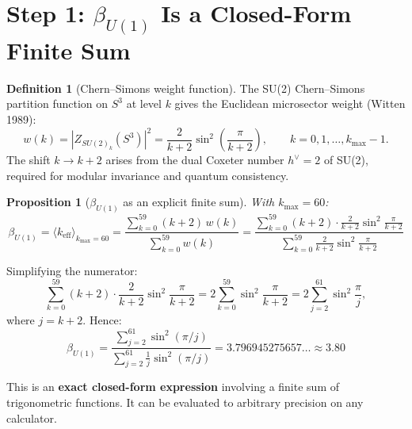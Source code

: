 \documentclass[11pt,a4paper]{article}
\newtheorem{proposition}{Proposition}
\theoremstyle{definition}
\newtheorem{definition}{Definition}
\begin{document}
\section{Step 1: $\beta_{U(1)}$ Is a Closed-Form Finite Sum}

\begin{definition}[Chern--Simons weight function]
The SU(2) Chern--Simons partition function on $S^3$ at level $k$ gives the
Euclidean microsector weight (Witten 1989):
\begin{equation}\label{eq:CS-weight}
w(k) = |Z_{SU(2)_k}(S^3)|^2 = \frac{2}{k+2}\sin^2\!\left(\frac{\pi}{k+2}\right),
\qquad k = 0, 1, \ldots, k_{\max}-1.
\end{equation}
The shift $k \to k+2$ arises from the dual Coxeter number $h^\vee = 2$ of SU(2),
required for modular invariance and quantum consistency.
\end{definition}

\begin{proposition}[$\beta_{U(1)}$ as an explicit finite sum]
\label{prop:beta}
With $k_{\max} = 60$:
\begin{equation}\label{eq:beta-def}
\boxed{
\beta_{U(1)} = \langle k_{\mathrm{eff}}\rangle_{k_{\max}=60}
= \frac{\displaystyle\sum_{k=0}^{59}(k+2)\,w(k)}
       {\displaystyle\sum_{k=0}^{59} w(k)}
= \frac{\displaystyle\sum_{k=0}^{59}(k+2)\cdot\frac{2}{k+2}\sin^2\!\frac{\pi}{k+2}}
       {\displaystyle\sum_{k=0}^{59}\frac{2}{k+2}\sin^2\!\frac{\pi}{k+2}}
}
\end{equation}
\end{proposition}

\noindent Simplifying the numerator:
\begin{equation}
\sum_{k=0}^{59}(k+2)\cdot\frac{2}{k+2}\sin^2\!\frac{\pi}{k+2}
= 2\sum_{k=0}^{59}\sin^2\!\frac{\pi}{k+2}
= 2\sum_{j=2}^{61}\sin^2\!\frac{\pi}{j},
\end{equation}
where $j = k+2$.  Hence:
\begin{equation}\label{eq:beta-simplified}
\boxed{
\beta_{U(1)} = \frac{\displaystyle\sum_{j=2}^{61}\sin^2(\pi/j)}
               {\displaystyle\sum_{j=2}^{61}\frac{1}{j}\sin^2(\pi/j)}
= 3.796945275657\ldots \approx 3.80
}
\end{equation}

This is an \textbf{exact closed-form expression} involving a finite sum of
trigonometric functions.  It can be evaluated to arbitrary precision on any
calculator.
\end{document}
